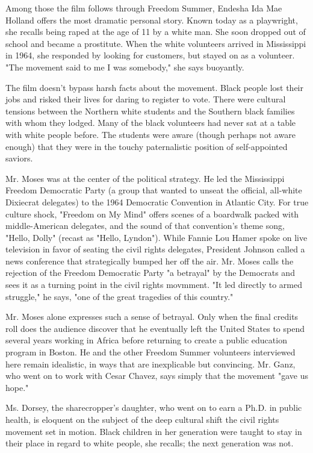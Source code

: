 Among those the film follows through Freedom Summer, Endesha Ida Mae
Holland offers the most dramatic personal story. Known today as a
playwright, she recalls being raped at the age of 11 by a white man. She
soon dropped out of school and became a prostitute. When the white
volunteers arrived in Mississippi in 1964, she responded by looking for
customers, but stayed on as a volunteer. "The movement said to me I was
somebody," she says buoyantly.

The film doesn't bypass harsh facts about the movement. Black people
lost their jobs and risked their lives for daring to register to vote.
There were cultural tensions between the Northern white students and the
Southern black families with whom they lodged. Many of the black
volunteers had never sat at a table with white people before. The
students were aware (though perhaps not aware enough) that they were in
the touchy paternalistic position of self-appointed saviors.

Mr. Moses was at the center of the political strategy. He led the
Mississippi Freedom Democratic Party (a group that wanted to unseat the
official, all-white Dixiecrat delegates) to the 1964 Democratic
Convention in Atlantic City. For true culture shock, "Freedom on My
Mind" offers scenes of a boardwalk packed with middle-American
delegates, and the sound of that convention's theme song, "Hello, Dolly"
(recast as "Hello, Lyndon"). While Fannie Lou Hamer spoke on live
television in favor of seating the civil rights delegates, President
Johnson called a news conference that strategically bumped her off the
air. Mr. Moses calls the rejection of the Freedom Democratic Party "a
betrayal" by the Democrats and sees it as a turning point in the civil
rights movmment. "It led directly to armed struggle," he says, "one of
the great tragedies of this country."

Mr. Moses alone expresses such a sense of betrayal. Only when the final
credits roll does the audience discover that he eventually left the
United States to spend several years working in Africa before returning
to create a public education program in Boston. He and the other Freedom
Summer volunteers interviewed here remain idealistic, in ways that are
inexplicable but convincing. Mr. Ganz, who went on to work with Cesar
Chavez, says simply that the movement "gave us hope."

Ms. Dorsey, the sharecropper's daughter, who went on to earn a Ph.D. in
public health, is eloquent on the subject of the deep cultural shift the
civil rights movement set in motion. Black children in her generation
were taught to stay in their place in regard to white people, she
recalls; the next generation was not.

